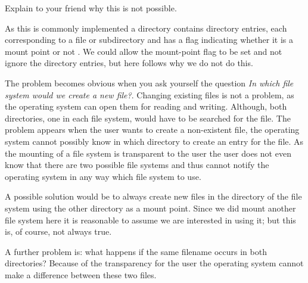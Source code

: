 \documentclass[addpoints]{miunexam}
\begin{document}
\begin{questions}
  Explain to your friend why this is not possible.

  \begin{solution}
    As this is commonly implemented a directory contains directory entries, 
    each corresponding to a file or subdirectory and has a flag indicating 
    whether it is a mount point or not \cite[pp.  
    444--445]{Silberschatz2009osc}.
    We could allow the mount-point flag to be set and not ignore the directory 
    entries, but here follows why we do not do this.
    
    The problem becomes obvious when you ask yourself the question \emph{In 
    which file system would we create a new file?}.
		Changing existing files is not a problem, as the operating system can open 
		them for reading and writing.
    Although, both directories, one in each file system, would have to be 
    searched for the file.
		The problem appears when the user wants to create a non-existent file, the 
		operating system cannot possibly know in which directory to create an entry 
		for the file.
		As the mounting of a file system is transparent to the user the user does 
		not even know that there are two possible file systems and thus cannot 
		notify the operating system in any way which file system to use.

		A possible solution would be to always create new files in the directory of 
		the file system using the other directory as a mount point.
		Since we did mount another file system here it is reasonable to assume we 
		are interested in using it; but this is, of course, not always true.

    A further problem is: what happens if the same filename occurs in both 
    directories?
    Because of the transparency for the user the operating system cannot make 
    a difference between these two files.
  \end{solution}


\end{questions}
\end{document}
